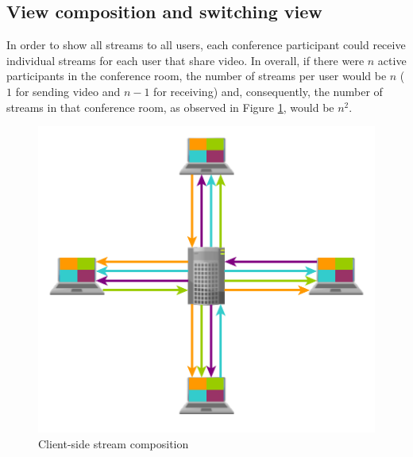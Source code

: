 	\subsection{View composition and switching view}

		In order to show all streams to all users, each conference participant could receive individual streams for each user that share video. In overall, if there were $n$ active participants in the conference room, the number of streams per user would be $n$ ($1$ for sending video and $n-1$ for receiving) and, consequently, the number of streams in that conference room, as observed in Figure \ref{fig:xcomposite}, would be $n^2$.


\begin{figure}
\centering
\begin{minipage}[b]{0.45\linewidth}
	\centering
	\includegraphics[width=\textwidth]{figures/xcomposite.pdf}
		\caption{Client-side stream composition}
	\label{fig:xcomposite}
\end{minipage}
\quad
\begin{minipage}[b]{0.45\linewidth}
	\centering

\end{minipage}
\end{figure}
